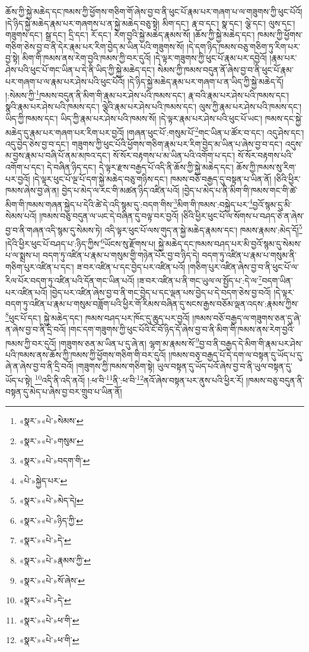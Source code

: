 ཆོས་ཀྱི་སྐྱེ་མཆེད་དང་ཁམས་ཀྱི་ཕྱོགས་གཅིག་གོ་ཞེས་བྱ་བ་ནི་ཕུང་པོ་རྣམ་པར་གཞག་པ་ལ་གཟུགས་ཀྱི་ཕུང་པོའོ། །དེ་ཉིད་སྐྱེ་མཆེད་རྣམ་པར་གཞགས་པ་ན་སྐྱེ་མཆེད་བཅུ་སྟེ། མིག་དང་། རྣ་བ་དང་། སྣ་དང་། ལྕེ་དང་། ལུས་དང་། གཟུགས་དང་། སྒྲ་དང་། དྲི་དང་། རོ་དང་། རེག་བྱའི་སྐྱེ་མཆེད་རྣམས་སོ། །ཆོས་ཀྱི་སྐྱེ་མཆེད་དང་། ཁམས་ཀྱི་ཕྱོགས་གཅིག་ཅེས་བྱ་བ་ནི་དེར་རྣམ་པར་རིག་བྱེད་མ་ཡིན་པའི་གཟུགས་སོ། །དེ་དག་ཉིད་ཁམས་བཅུ་གཅིག་ཏུ་རིག་པར་བྱ་སྟེ། མིག་གི་ཁམས་ནས་རེག་བྱའི་ཁམས་ཀྱི་བར་དུའོ། །དེ་ལྟར་གཟུགས་ཀྱི་ཕུང་པོ་རྣམ་པར་དབྱེའོ། །རྣམ་པར་ཤེས་པའི་ཕུང་པོ་གང་ཡིན་པ་དེ་ནི་ཡིད་ཀྱི་སྐྱེ་མཆེད་དང་། སེམས་ཀྱི་ཁམས་བདུན་ནོ་ཞེས་བྱ་བ་ནི་ཕུང་པོ་རྣམ་པར་གཞག་པ་ལ་རྣམ་པར་ཤེས་པའི་ཕུང་པོའོ། །དེ་ཉིད་སྐྱེ་མཆེད་རྣམ་པར་གཞག་པ་ན་ཡིད་ཀྱི་སྐྱེ་མཆེད་དོ། །:སེམས་ཀྱི་\footnote{«སྣར་»«པེ་»སེམས་}ཁམས་བདུན་ནི་མིག་གི་རྣམ་པར་ཤེས་པའི་ཁམས་དང་། རྣ་བའི་རྣམ་པར་ཤེས་པའི་ཁམས་དང་། སྣའི་རྣམ་པར་ཤེས་པའི་ཁམས་དང་། ལྕེའི་རྣམ་པར་ཤེས་པའི་ཁམས་དང་། ལུས་ཀྱི་རྣམ་པར་ཤེས་པའི་ཁམས་དང་། ཡིད་ཀྱི་ཁམས་དང་། ཡིད་ཀྱི་རྣམ་པར་ཤེས་པའི་ཁམས་སོ། །དེ་ལྟར་རྣམ་པར་ཤེས་པའི་ཕུང་པོ་ཡང་། ཁམས་དང་སྐྱེ་མཆེད་དུ་རྣམ་པར་གཞག་པར་རིག་པར་བྱའོ། །གཞན་ཕུང་པོ་:གསུམ་པོ་\footnote{«སྣར་»«པེ་»གསུམ་}གང་ཡིན་པ་ཚོར་བ་དང་། འདུ་ཤེས་དང་། འདུ་བྱེད་ཅེས་བྱ་བ་དང་། གཟུགས་ཀྱི་ཕུང་པོའི་ཕྱོགས་གཅིག་རྣམ་པར་རིག་བྱེད་མ་ཡིན་པ་ཞེས་བྱ་བ་དང་། འདུས་མ་བྱས་རྣམ་པ་བཞི་པོ་ནམ་མཁའ་དང་། སོ་སོར་བརྟགས་པ་མ་ཡིན་པའི་འགོག་པ་དང་། སོ་སོར་བརྟགས་པའི་འགོག་པ་དང་། དེ་བཞིན་ཉིད་དང་། དེ་ལྟར་རྫས་བརྒྱད་པོ་འདི་ནི་ཆོས་ཀྱི་སྐྱེ་མཆེད་དང་། ཆོས་ཀྱི་ཁམས་སུ་རིག་པར་བྱའོ། །དེ་ལྟར་ཕུང་པོ་ལྔ་པོ་དག་སྐྱེ་མཆེད་བཅུ་གཉིས་དང་། ཁམས་བཅོ་བརྒྱད་དུ་བསྟན་པ་ཡིན་ནོ། །ཅིའི་ཕྱིར་ཁམས་ཞེས་བྱ་ཞེ་ན། བྱེད་པ་མེད་ལ་རང་གི་མཚན་ཉིད་འཛིན་པའོ། །བྱེད་པ་མེད་པ་ནི་མིག་གི་ཁམས་གང་གི་ཚེ་མིག་གི་ཁམས་གཞན་སྐྱེད་པ་དེའི་ཚེ་དེ་འདི་སྙམ་དུ་:བདག་གིས་\footnote{«སྣར་»«པེ་»བདག་གི་}མིག་གི་ཁམས་:བསྐྱེད་པར་\footnote{«པེ་»སྐྱེད་པར་}བྱའོ་སྙམ་དུ་མི་སེམས་པའོ། །ཁམས་བཅུ་བདུན་ལ་ཡང་དེ་བཞིན་དུ་བལྟ་བར་བྱའོ། །ཅིའི་ཕྱིར་ཕུང་པོ་ལ་སོགས་པ་བཤད་ཅེ་ན་ཞེས་བྱ་བ་ནི་གཞན་འདི་སྙམ་དུ་སེམས་ཏེ། འདི་ལྟར་ཕུང་པོ་ལས་གུད་ན་སྐྱེ་མཆེད་རྣམས་དང་། ཁམས་རྣམས་:མེད་དོ།\footnote{«སྣར་»«པེ་»མེད་དེ།} །དེའི་ཕྱིར་ཕུང་པོ་བཤད་པ་:ཉིད་ཀྱིས་\footnote{«སྣར་»«པེ་»ཉིད་ཀྱི་}ཡོངས་སུ་རྫོགས་པ། སྐྱེ་མཆེད་དང་ཁམས་བཤད་པར་མི་བྱའོ་སྙམ་དུ་སེམས་པ་ལ་སྨྲས་པ། བདག་ཏུ་འཛིན་པ་རྣམ་པ་གསུམ་གྱི་གཉེན་པོར་བྱ་བ་ཉིད་དེ། བདག་ཏུ་འཛིན་པ་རྣམ་པ་གསུམ་ནི་གཅིག་པུར་འཛིན་པ་དང་། ཟ་བར་འཛིན་པ་དང་བྱེད་པར་འཛིན་པའོ། །གཅིག་པུར་འཛིན་ཞེས་བྱ་བ་ནི་ཕུང་པོ་ལ་རིལ་པོར་བདག་ཏུ་འཛིན་པའི་དོན་གང་ཡིན་པའོ། །ཟ་བར་འཛིན་པ་ནི་གང་ཡུལ་ལ་སྤྱོད་པ་:དེ་ལ་\footnote{«སྣར་»«པེ་»དེ་}བདག་ཡིན་པར་འཛིན་པའོ། །བྱེད་པར་འཛིན་ཞེས་བྱ་བ་ནི་གང་བྱེད་པ་དང་ལྡན་པས་བྱེད་པ་དེ་བདག་ཅེས་བྱ་བའོ། །དེ་ལྟར་བདག་ཏུ་འཛིན་པ་རྣམ་པ་གསུམ་བཟློག་པའི་ཕྱིར་གོ་རིམས་བཞིན་དུ་སངས་རྒྱས་བཅོམ་ལྡན་འདས་:རྣམས་ཀྱིས་\footnote{«སྣར་»«པེ་»རྣམས་ཀྱི་}ཕུང་པོ་དང་། སྐྱེ་མཆེད་དང་། ཁམས་བཤད་པར་ཁོང་དུ་ཆུད་པར་བྱའོ། །ཁམས་བཅོ་བརྒྱད་ལ་གཟུགས་ཅན་དུ་ཞེ་ན་ཞེས་བྱ་བ་ནི་དྲི་བའོ། །གང་དག་གཟུགས་ཀྱི་ཕུང་པོའི་ངོ་བོ་ཉིད་དོ་ཞེས་བྱ་བ་ནི་མིག་གི་ཁམས་ནས་རེག་བྱའི་ཁམས་ཀྱི་བར་དུའོ། །གཟུགས་ཅན་མ་ཡིན་པ་དུ་ཞེ་ན། ལྷག་མ་རྣམས་སོ་\footnote{«སྣར་»«པེ་»སོ་ཞེས་}བྱ་བ་ནི་བརྒྱད་དེ་མིག་གི་རྣམ་པར་ཤེས་པའི་ཁམས་ནས་ཆོས་ཀྱི་ཁམས་ཀྱི་ཕྱོགས་གཅིག་གི་བར་དུའོ། །ཁམས་བཅྭ་བརྒྱད་པོ་དེ་དག་ལ་བསྟན་དུ་ཡོད་པ་དུ་ཞེ་ན་ཞེས་བྱ་བ་ནི་དྲི་བའོ། །གཟུགས་ཀྱི་ཁམས་གཅིག་སྟེ། ཡུལ་བསྟན་དུ་ཡོད་པའོ་ཞེས་བྱ་བ་ནི་ཡུལ་བསྟན་དུ་ཡོད་པ་སྟེ། \footnote{«སྣར་»«པེ་»དེ་}འདི་ནི་འདི་ནའོ། །:ཕ་བི་\footnote{«སྣར་»«པེ་»ཕ་གི་}ནི་:ཕ་བི་\footnote{«སྣར་»«པེ་»ཕ་གི་}ནའོ་ཞེས་བསྟན་པར་ནུས་པའི་ཕྱིར་རོ། །ཁམས་བཅུ་བདུན་ནི་བསྟན་དུ་མེད་པ་ཞེས་བྱ་བར་གྲུབ་པ་ཡིན་ནོ། 